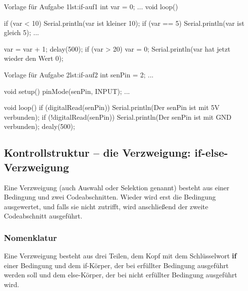 \begin{multicols}{2}
\null\vfill 
\begin{arduinoCode}{Vorlage für Aufgabe 1}{lst:if-auf1}
int var = 0;
...
void loop() {
  if (var < 10) {
    Serial.println(var ist kleiner 10);
  }
  if (var == 5) {
    Serial.println(var ist gleich 5);
  }
  ...
  
  var = var + 1; 
  delay(500);
  if (var > 20) {
    var = 0;
    Serial.println(var hat jetzt wieder den Wert 0);
  }
}
\end{arduinoCode}
\vfill\null 
\columnbreak

\null\vfill
\begin{arduinoCode}{Vorlage für Aufgabe 2}{lst:if-auf2}
int senPin = 2;
...

void setup() {
  pinMode(senPin, INPUT);
  ...
}

void loop() {
  if (digitalRead(senPin)) {
    Serial.println(Der senPin ist mit 5V verbunden);
  }
  if (!digitalRead(senPin)) {
    Serial.println(Der senPin ist mit GND verbunden);
  }
  dealy(500);
}
\end{arduinoCode}
\null\vfill
\end{multicols}



\subsection{Kontrollstruktur -- die Verzweigung: if-else-Verzweigung}

Eine Verzweigung (auch Auswahl oder Selektion genannt) besteht aus einer Bedingung und zwei Codeabschnitten. Wieder wird erst die Bedingung ausgewertet, und falls sie nicht zutrifft, wird anschließend der zweite Codeabschnitt ausgeführt.



\subsubsection{Nomenklatur}

Eine Verzweigung besteht aus drei Teilen, dem Kopf mit dem Schlüsselwort \textbf{if}  einer Bedingung und dem if-Körper, der bei erfüllter Bedingung ausgeführt werden soll und dem else-Körper, der bei nicht erfüllter Bedingung ausgeführt wird. 

